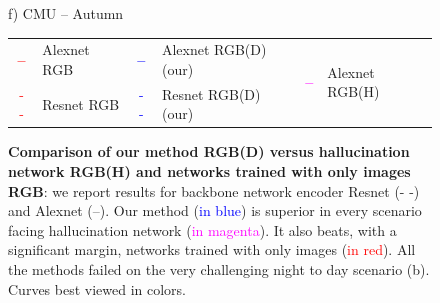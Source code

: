 \begin{figure}
\begin{minipage}{0.27\linewidth}
		f) CMU -- Autumn
	\end{minipage}
	
	\vspace{0.2cm}
	
	\begin{scriptsize}
	\begin{tabular}{c l c l c l }
		\textcolor{red}{\Large{\textbf{--}}} & Alexnet RGB & \textcolor{blue}{\Large{\textbf{--}}} & Alexnet RGB(D) (our) & 
		\multirow{2}{*}{\textcolor{magenta}{\textbf{\Large{--}}}} & \multirow{2}{*}{Alexnet RGB(H)}\\
		\textcolor{red}{\Large{- -}} & Resnet RGB & \textcolor{blue}{\Large{- -}} & Resnet RGB(D) (our) 
	\end{tabular}		
	\end{scriptsize}
	
	\caption[Comparison of our method versus competitors]{\label{fig:results} \textbf{Comparison of our method RGB(D) versus hallucination network RGB(H) and networks trained with only images RGB}: we report results for backbone network encoder Resnet (- -) and Alexnet (--). Our method (\textcolor{blue}{in blue}) is superior in every scenario facing hallucination network (\textcolor{magenta}{in magenta}). It also beats, with a significant margin, networks trained with only images (\textcolor{red}{in red}). All the methods failed on the very challenging night to day scenario (b). Curves best viewed in colors.}
	
\end{figure}